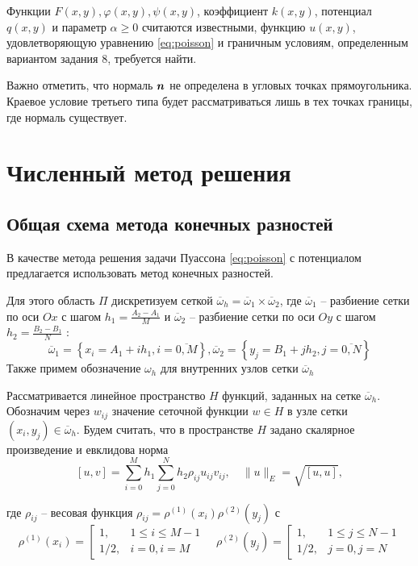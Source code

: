 \documentclass[12pt, fleqn]{article}
\theoremstyle{definition}
\def\vec#1{\mathchoice{\mbox{\boldmath$\displaystyle#1$}}
{\mbox{\boldmath$\textstyle#1$}} {\mbox{\boldmath$\scriptstyle#1$}} {\mbox{\boldmath$\scriptscriptstyle#1$}}}
\begin{document}
Функции $F(x, y), \varphi(x, y), \psi(x, y)$, коэффициент $k(x, y)$, потенциал $q(x, y)$ и параметр $\alpha \geqslant 0$ считаются известными, функцию $u(x, y)$, удовлетворяющую уравнению \ref{eq:poisson} и граничным условиям, определенным вариантом задания 8, требуется найти.

Важно отметить, что нормаль $\vec{n}$ не определена в угловых точках прямоугольника. Краевое условие третьего типа будет рассматриваться лишь в тех точках границы, где нормаль существует.
\section{Численный метод решения}\label{sec:numeric}
\subsection{Общая схема метода конечных разностей}
В качестве метода решения задачи Пуассона \ref{eq:poisson} с потенциалом предлагается использовать метод конечных разностей.

Для этого область $\Pi$ дискретизуем сеткой $\overline{\omega}_{h}=\overline{\omega}_{1} \times \overline{\omega}_{2}$, где $\overline{\omega}_{1}$ -- разбиение сетки по оси $Ox$ с шагом $h_{1}=\frac{A_{2}-A_{1}}{M}$ и $\overline{\omega}_{2}$ -- разбиение сетки по оси $Oy$ с шагом $ h_{2}=\frac{B_{2}-B_{1}}{N}$ :
\abovedisplayskip=1pt
\belowdisplayskip=2pt
\noindent
$$
\overline{\omega}_{1}=\left\{x_{i}=A_{1}+i h_{1}, i=\overline{0, M}\right\}, \overline{\omega}_{2}=\left\{y_{j}=B_{1}+j h_{2}, j=\overline{0, N}\right\}
$$
Также примем обозначение $\omega_{h}$ для внутренних узлов сетки $\overline{\omega}_{h}$

Рассматривается линейное пространство $H$ функций, заданных на сетке $\overline{\omega}_{h}$. Обозначим через $w_{ij}$ значение сеточной функции $w \in H$ в узле сетки $\left(x_{i}, y_{j}\right) \in \overline{\omega}_{h}$. Будем считать, что в пространстве $H$ задано скалярное произведение и евклидова норма
\abovedisplayskip=1pt
\belowdisplayskip=2pt
\noindent
$$
[u, v]=\sum_{i=0}^{M} h_{1} \sum_{j=0}^{N} h_{2} \rho_{i j} u_{i j} v_{i j}, \quad\|u\|_{E}=\sqrt{[u, u]},
$$

где $\rho_{i j}$ -- весовая функция $\rho_{i j}=\rho^{(1)}\left(x_{i}\right) \rho^{(2)}\left(y_{j}\right)$ с
\abovedisplayskip=1pt
\belowdisplayskip=2pt
\noindent
$$
\rho^{(1)}\left(x_{i}\right)=\left[\begin{array}{rl}
1, & 1 \leqslant i \leqslant M-1 \\
1 / 2, & i=0, i=M
\end{array} \quad \rho^{(2)}\left(y_{j}\right)=\left[\begin{array}{rl}
1, & 1 \leqslant j \leqslant N-1 \\
1 / 2, & j=0, j=N
\end{array}\right.\right.
$$
\end{document}
